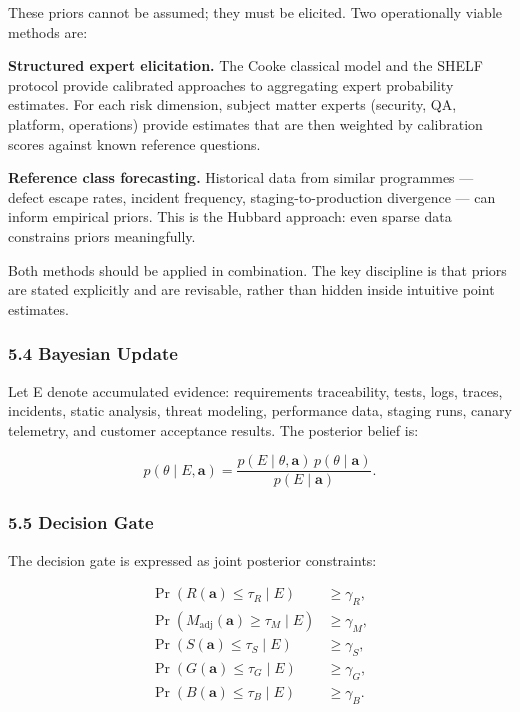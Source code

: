 \documentclass[
]{article}
\begin{document}
These priors cannot be assumed; they must be elicited. Two operationally
viable methods are:

\textbf{Structured expert elicitation.} The Cooke classical model and
the SHELF protocol provide calibrated approaches to aggregating expert
probability estimates. For each risk dimension, subject matter experts
(security, QA, platform, operations) provide estimates that are then
weighted by calibration scores against known reference questions.

\textbf{Reference class forecasting.} Historical data from similar
programmes --- defect escape rates, incident frequency,
staging-to-production divergence --- can inform empirical priors. This
is the Hubbard approach: even sparse data constrains priors
meaningfully.

Both methods should be applied in combination. The key discipline is
that priors are stated explicitly and are revisable, rather than hidden
inside intuitive point estimates.

\subsubsection{5.4 Bayesian Update}\label{bayesian-update}

Let E denote accumulated evidence: requirements traceability, tests,
logs, traces, incidents, static analysis, threat modeling, performance
data, staging runs, canary telemetry, and customer acceptance results.
The posterior belief is:

\[p(\theta \mid E, \mathbf{a}) = \frac{p(E \mid \theta, \mathbf{a})\,p(\theta \mid \mathbf{a})}{p(E \mid \mathbf{a})}.\]

\subsubsection{5.5 Decision Gate}\label{decision-gate}

The decision gate is expressed as joint posterior constraints:

\[\begin{aligned}
\Pr(R(\mathbf{a}) \le \tau_R \mid E) &\ge \gamma_R,\\
\Pr(M_{\mathrm{adj}}(\mathbf{a}) \ge \tau_M \mid E) &\ge \gamma_M,\\
\Pr(S(\mathbf{a}) \le \tau_S \mid E) &\ge \gamma_S,\\
\Pr(G(\mathbf{a}) \le \tau_G \mid E) &\ge \gamma_G,\\
\Pr(B(\mathbf{a}) \le \tau_B \mid E) &\ge \gamma_B.
\end{aligned}\]
\end{document}
